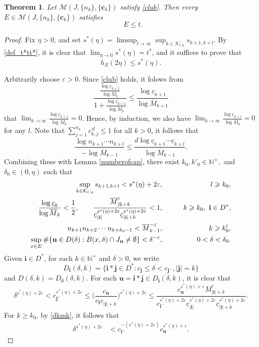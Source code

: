 \documentclass[12pt]{amsart}
\numberwithin{equation}{section}
\theoremstyle{plain}
\newtheorem{theorem}{Theorem}[section]
\theoremstyle{remark}
\theoremstyle{definition}
\newcommand{\kk}{\mathcal{K}}
\newcommand{\om}{\overline{M}}
\newcommand{\N}{\mathbb{N}}
\newcommand{\iii}{\mathbf{i}}
\newcommand{\jjj}{\mathbf{j}}
\newcommand{\bu}{\mathbf{u}}
\newcommand{\ccc}{\mathbf{c}}
\newcommand{\eps}{\varepsilon}
\newcommand{\de}{\delta}
\newcommand{\f}{\frac}
\newcommand{\uc}{\underline{c}}
\renewcommand{\ge}{\geqslant}
\renewcommand{\le}{\leqslant}
\renewcommand{\leq}{\leqslant}
\DeclareMathOperator{\dimqa}{dim_{qA}}
\begin{document}
	
	\begin{theorem}\label{xiaoyu}
		Let $ \mathcal{M}(J,\{n_k\},\{\ccc_k\})$ satisfy \eqref{club}. Then every  $E\in\mathcal{M}(J,\{n_k\},\{\ccc_k\})$ satisfies
		\[
		\dimqa E\le t.
		\]
	\end{theorem}
	\begin{proof}%
		Fix $\eta>0$, and  set  $s^{*}(\eta)=\limsup_{l\to\infty}\sup_{k\in \kk_{l,\eta}} s_{k+1,k+l}$. By \eqref{def_t*tt*}, it is clear that $\lim_{\eta \to 0} s^{*}(\eta)=t^*$,  and it suffices to prove that
		\[
		h_E(2\eta)\le s^*(\eta).
		\]
		
		Arbitrarily choose $\eps>0$.	Since \eqref{club} holds, it folows from
		\[
		\f{\f{\log \uc_{k+1}}{\log \om_k}}{1+\f{\log \uc_{k+1}}{\log \om_k}}\le\f{\log \uc_{k+1}}{\log \om_{k+1}}
		\]
		 that $\lim_{k\to\infty}\f{\log \uc_{k+1}}{\log \om_k}=0$. Hence, by induction, we also have $\lim_{k\to\infty}\f{\log \uc_{k+l}}{\log \om_k}=0$ for any $l$.   Note that  $\sum
		_{j=1}^{n_{k}}c_{k,j}^{\,d}\leq 1$ for all $k>0$, it follows that
		\[
		\f{\log n_{k+1}\cdots n_{k+l}}{-\log \om_{k-1}}\le\f{d\log \uc_{k+1}\cdots \uc_{k+l}}{\log \om_{k-1}} .
		\]
Combining these with  Lemma \ref{numberofcap},
		there exist $k_0, k'_0 \in {\N}^+,$ and $\de_0\in (0,\eta)$ such that
		\begin{eqnarray}
			\sup_{k\in \kk_{l,\eta}} s_{k+1,k+l}<s^*(\eta)+2\eps, \qquad &&l\ge k_0,\label{sk}   \\
			\f{\log \uc_k}{\log \om_k}<\frac{1}{2},\qquad  \frac{\om_{|\iii|+k}^{\eps}}{\uc_{|\iii|}^{s^*(\eta)+2\eps}\uc_{|\iii|+k}^{s^*(\eta)+2\eps}}<1,\qquad && k\ge k_0,\ \iii\in D^*,\vspace{0.5em}\label{dkmk}\\
			n_{k+1}n_{k+2}\cdots n_{k+k_0-1}<\om_{k-1}^{- {\eps}},\qquad &&k\ge k'_0,\label{nk}\vspace{0.2em}\\
			\sup_{x\in E}\#\{\bu\in D(\delta):B(x,\de)\cap J_{\bu}\neq \emptyset\}<\de^{-{\eps}},\qquad &&0<\de<\de_0.\label{numberofcut'}
		\end{eqnarray}
		Given $\iii\in D^*$, for each $k\in{\N}^+$ and $\delta>0$, we write
		\[
		D_{\iii}(\de,k)=\{\iii*\jjj\in D^*:c_{\jjj}\le \de<c_{\jjj^-},|\jjj|=k\}
		\]
		and $D(\de,k)=D_{\emptyset}(\de,k)$. For each $\bu=\iii*\jjj\in D_{\iii}(\de,k)$, it is clear that
		$$
		\de^{s^*(\eta)+2\eps}< c_{\jjj^-}^{s^*(\eta)+2\eps} \leq \Big(\frac{c_{\bu}}{c_{\iii}\uc_{|\iii|+k}}\Big)^{s^*(\eta)+2\eps} \le  \frac{c_{\bu}^{s^*(\eta)+\eps}\om_{|\iii|+k}^{\eps}}{c_{\iii^-}^{s^*(\eta)+2\eps}\uc_{|\iii|}^{s^*(\eta)+2\eps}\uc_{|\iii|+k}^{s^*(\eta)+2\eps}}.
		$$
		For $k\ge k_0$,  by \eqref{dkmk}, it follows that
		\begin{equation}\label{estdelta1}
			\begin{aligned}
				\de^{s^*(\eta)+2\eps}&< {c_{\iii^-}^{-(s^*(\eta)+2\eps)}}  c_{\bu}^{s^*(\eta)+\eps} .
			\end{aligned}
		\end{equation}
		

\end{proof}
\end{document}
